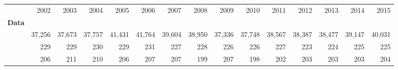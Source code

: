 \begin{tabular}{lllllllllllllll}
\cline{1-15}
\multicolumn{1}{c}{} &
  \multicolumn{1}{|r}{2002} &
  \multicolumn{1}{r}{2003} &
  \multicolumn{1}{r}{2004} &
  \multicolumn{1}{r}{2005} &
  \multicolumn{1}{r}{2006} &
  \multicolumn{1}{r}{2007} &
  \multicolumn{1}{r}{2008} &
  \multicolumn{1}{r}{2009} &
  \multicolumn{1}{r}{2010} &
  \multicolumn{1}{r}{2011} &
  \multicolumn{1}{r}{2012} &
  \multicolumn{1}{r}{2013} &
  \multicolumn{1}{r}{2014} &
  \multicolumn{1}{r}{2015} \\
\cline{1-15}
\multicolumn{1}{l}{\textbf{Data}} &
  \multicolumn{1}{|r}{} &
  \multicolumn{1}{r}{} &
  \multicolumn{1}{r}{} &
  \multicolumn{1}{r}{} &
  \multicolumn{1}{r}{} &
  \multicolumn{1}{r}{} &
  \multicolumn{1}{r}{} &
  \multicolumn{1}{r}{} &
  \multicolumn{1}{r}{} &
  \multicolumn{1}{r}{} &
  \multicolumn{1}{r}{} &
  \multicolumn{1}{r}{} &
  \multicolumn{1}{r}{} &
  \multicolumn{1}{r}{} \\
\multicolumn{1}{l}{\hspace{1em}{$\#$ obs.}} &
  \multicolumn{1}{|r}{37,256} &
  \multicolumn{1}{r}{37,673} &
  \multicolumn{1}{r}{37,757} &
  \multicolumn{1}{r}{41,431} &
  \multicolumn{1}{r}{41,764} &
  \multicolumn{1}{r}{39,604} &
  \multicolumn{1}{r}{38,950} &
  \multicolumn{1}{r}{37,336} &
  \multicolumn{1}{r}{37,748} &
  \multicolumn{1}{r}{38,567} &
  \multicolumn{1}{r}{38,387} &
  \multicolumn{1}{r}{38,477} &
  \multicolumn{1}{r}{39,147} &
  \multicolumn{1}{r}{40,031} \\
\multicolumn{1}{l}{\hspace{1em}{$\#$ sectors}} &
  \multicolumn{1}{|r}{229} &
  \multicolumn{1}{r}{229} &
  \multicolumn{1}{r}{230} &
  \multicolumn{1}{r}{229} &
  \multicolumn{1}{r}{231} &
  \multicolumn{1}{r}{227} &
  \multicolumn{1}{r}{228} &
  \multicolumn{1}{r}{226} &
  \multicolumn{1}{r}{226} &
  \multicolumn{1}{r}{227} &
  \multicolumn{1}{r}{223} &
  \multicolumn{1}{r}{224} &
  \multicolumn{1}{r}{225} &
  \multicolumn{1}{r}{225} \\
\multicolumn{1}{l}{\hspace{1em}{$\#$ origin countries}} &
  \multicolumn{1}{|r}{206} &
  \multicolumn{1}{r}{211} &
  \multicolumn{1}{r}{210} &
  \multicolumn{1}{r}{206} &
  \multicolumn{1}{r}{207} &
  \multicolumn{1}{r}{207} &
  \multicolumn{1}{r}{199} &
  \multicolumn{1}{r}{207} &
  \multicolumn{1}{r}{198} &
  \multicolumn{1}{r}{202} &
  \multicolumn{1}{r}{203} &
  \multicolumn{1}{r}{203} &
  \multicolumn{1}{r}{203} &
  \multicolumn{1}{r}{204} \\

\end{tabular}
